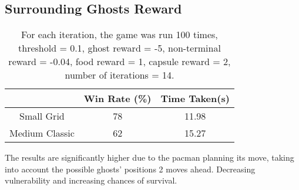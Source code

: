 \documentclass[12pt]{report}
\begin{document}
          \subsection*{Surrounding Ghosts Reward}
            \begin{table}[H]
              \begin{center}
                \begin{adjustbox}{max width=\textwidth}
                \begin{tabular}{*{3}{c}}
                  \textbf{} & \textbf{Win Rate (\%)} & \textbf{Time Taken(s)} \\
                  \hline
                        Small Grid & 78 & 11.98 \\
                        Medium Classic & 62 & 15.27 \\

                \end{tabular}
                \end{adjustbox}
                \caption{For each iteration, the game was run 100 times, threshold = 0.1, ghost reward = -5, non-terminal reward = -0.04, food reward = 1, capsule reward = 2, number of iterations = 14.}
                \label{tab:table4}
              \end{center}
            \end{table}
            \vspace{-9mm}
            The results are significantly higher due to the pacman planning its move, taking into account the possible ghosts' positions 2 moves ahead. Decreasing vulnerability and increasing chances of survival.
\end{document}
